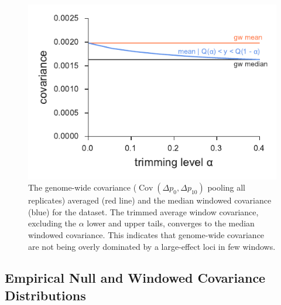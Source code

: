 \documentclass[11pt]{article}
\DeclareMathOperator{\cov}{Cov}
\begin{document}
{{\begin{figure}[!ht]
  \centering
  \includegraphics[]{figures/barghi-trimmed-mean.pdf}

  \caption{The genome-wide covariance ($\cov(\Delta p_0, \Delta p_10)$ pooling
    all replicates) averaged (red line) and the median windowed covariance
    (blue) for the \textcite{Barghi2019-qy} dataset. The trimmed average window
    covariance, excluding the $\alpha$ lower and upper tails, converges to the
     median windowed covariance. This indicates that genome-wide covariance are
     not being overly dominated by a large-effect loci in few windows.}

  \label{suppfig:barghi-trimmed-mean}
\end{figure}



\clearpage

\subsection{\textcite{Barghi2019-qy} Empirical Null and Windowed Covariance Distributions}

}}
\end{document}
